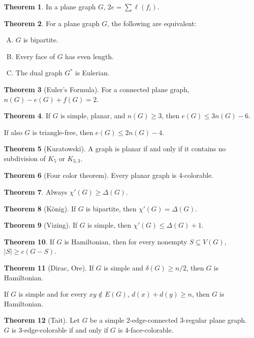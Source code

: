 \documentclass{article}
\theoremstyle{definition}
\newtheorem{theorem}{Theorem}
\begin{document}
\begin{theorem}
In a plane graph $G$, $2e=\sum \ell(f_i)$.
\end{theorem}

\begin{theorem}
For a plane graph $G$, the following are equivalent:
\vspace{-0.5em}
\begin{enumerate}[A)]
\setlength{\itemsep}{0pt}
\item $G$ is bipartite.
\item Every face of $G$ has even length.
\item The dual graph $G^*$ is Eulerian.
\end{enumerate}
\end{theorem}

\begin{theorem}[Euler's Formula]
For a connected plane graph, $n(G)-e(G)+f(G)=2$.
\end{theorem}
\begin{theorem}
If $G$ is simple, planar, and $n(G)\geq3$, then $e(G)\leq3n(G)-6$. 
\par
If also $G$ is triangle-free, then $e(G)\leq 2n(G)-4$.
\end{theorem}

\begin{theorem}[Kuratowski]
A graph is planar if and only if it contains no subdivision of $K_5$ or $K_{3,3}$.
\end{theorem}

\begin{theorem}[Four color theorem]
Every planar graph is 4-colorable.
\end{theorem}

\begin{theorem}
Always $\chi'(G)\geq \Delta(G)$.
\end{theorem}
\begin{theorem}[K\"onig]
If $G$ is bipartite, then $\chi'(G)=\Delta(G)$.
\end{theorem}
\begin{theorem}[Vizing]
If $G$ is simple, then $\chi'(G)\leq \Delta(G)+1$.
\end{theorem}


\begin{theorem}
If $G$ is Hamiltonian, then for every nonempty $S\subseteq V(G)$, $|S|\geq c(G-S)$.
\end{theorem}

\begin{theorem}[Dirac, Ore]
If $G$ is simple and $\delta(G)\geq n/2$, then $G$ is Hamiltonian.

If $G$ is simple and for every $xy\notin E(G)$, $d(x)+d(y)\geq n$, then $G$ is Hamiltonian.
\end{theorem}

\begin{theorem}[Tait]
Let $G$ be a simple 2-edge-connected 3-regular plane graph.  $G$ is 3-edge-colorable if and only if $G$ is 4-face-colorable.
\end{theorem}
\end{document}

